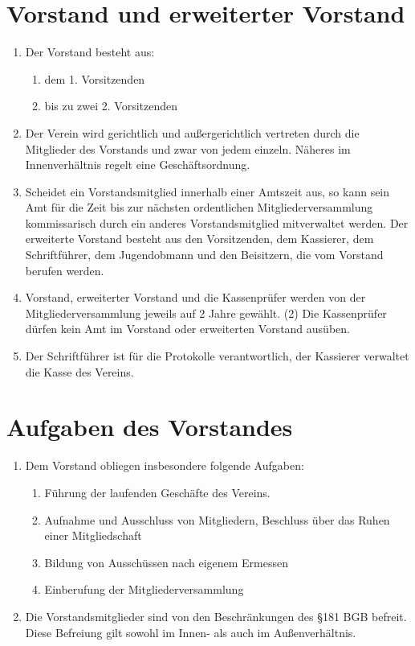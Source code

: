 \documentclass[10pt, twocolumn, parskip=half]{scrartcl}
\begin{document}
\section{Vorstand und erweiterter Vorstand}
\begin{enumerate}[noitemsep]
	\item Der Vorstand besteht aus:
	\begin{enumerate}[noitemsep]
		\item dem 1. Vorsitzenden
		\item bis zu zwei 2. Vorsitzenden
	\end{enumerate}
	\item Der Verein wird gerichtlich und außergerichtlich vertreten durch die Mitglieder des Vorstands und zwar von jedem einzeln. Näheres im Innenverhältnis regelt eine Geschäftsordnung.
	\item Scheidet ein Vorstandsmitglied innerhalb einer Amtszeit aus, so kann sein Amt für die Zeit bis zur nächsten ordentlichen Mitgliederversammlung kommissarisch durch ein anderes Vorstandsmitglied mitverwaltet werden.
	Der erweiterte Vorstand besteht aus den Vorsitzenden, dem Kassierer, dem
	Schriftführer, dem Jugendobmann und den Beisitzern, die vom Vorstand berufen
	werden.
	\item Vorstand, erweiterter Vorstand und die Kassenprüfer werden von der Mitgliederversammlung jeweils auf 2 Jahre gewählt. (2) Die Kassenprüfer dürfen kein Amt im Vorstand oder erweiterten Vorstand ausüben.
	\item Der Schriftführer ist für die Protokolle verantwortlich, der Kassierer verwaltet die Kasse des Vereins.
\end{enumerate}

\section{Aufgaben des Vorstandes}
\begin{enumerate}[noitemsep]
	\item Dem Vorstand obliegen insbesondere folgende Aufgaben:
	\begin{enumerate}[noitemsep]
		\item  Führung der laufenden Geschäfte des Vereins.
		\item Aufnahme und Ausschluss von Mitgliedern, Beschluss über das Ruhen einer Mitgliedschaft
		\item Bildung von Ausschüssen nach eigenem Ermessen
		\item Einberufung der Mitgliederversammlung
	\end{enumerate}
	\item Die Vorstandsmitglieder sind von den Beschränkungen des §181 BGB befreit. Diese Befreiung gilt sowohl im Innen- als auch im Außenverhältnis.
\end{enumerate}
\end{document}
